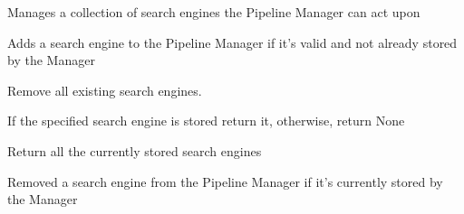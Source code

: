 \documentclass[letterpaper,10pt,english]{sphinxmanual}
\begin{document}
\begin{fulllineitems}
\label{api2.0:puppy.pipeline.SearchEngineManager}
Manages a collection of search engines the Pipeline Manager can act upon

\begin{fulllineitems}
\label{api2.0:puppy.pipeline.SearchEngineManager.add_search_engine}
Adds a search engine to the Pipeline Manager if it's valid and not already stored by the Manager

\end{fulllineitems}


\begin{fulllineitems}
\label{api2.0:puppy.pipeline.SearchEngineManager.clear_search_engines}
Remove all existing search engines.

\end{fulllineitems}


\begin{fulllineitems}
\label{api2.0:puppy.pipeline.SearchEngineManager.get_search_engine}
If the specified search engine is stored return it, otherwise, return None

\end{fulllineitems}


\begin{fulllineitems}
\label{api2.0:puppy.pipeline.SearchEngineManager.get_search_engines}
Return all the currently stored search engines

\end{fulllineitems}


\begin{fulllineitems}
\label{api2.0:puppy.pipeline.SearchEngineManager.remove_search_engine}
Removed a search engine from the Pipeline Manager if it's currently stored by the Manager

\end{fulllineitems}


\end{fulllineitems}
\end{document}
